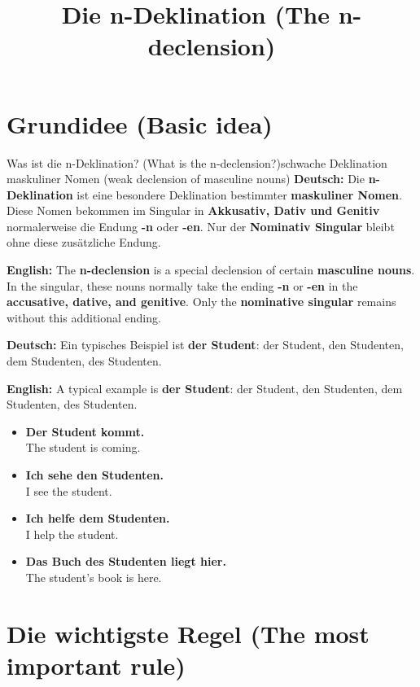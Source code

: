 \documentclass[a4paper,11pt]{article}
\title{Die n-Deklination \textnormal{(The n-declension)}}
\date{}
\newcommand{\GermanText}[1]{\textbf{Deutsch: }#1\par}
\newcommand{\EnglishText}[1]{{\small\color{SoftGray}\textbf{English: }#1\par}}
\newcommand{\ExampleItem}[2]{\item \textbf{#1}\\{\small\color{SoftGray}#2}}
\begin{document}
    \renewcommand{\contentsname}{Inhaltsverzeichnis \textnormal{(Table of Contents)}}
    \maketitle
    \tableofcontents
    \newpage

    \section{Grundidee \textnormal{(Basic idea)}}

        \begin{grammarentry}{Was ist die n-Deklination? \textnormal{(What is the n-declension?)}}{schwache Deklination maskuliner Nomen \textnormal{(weak declension of masculine nouns)}}
            \GermanText{Die \textbf{n-Deklination} ist eine besondere Deklination bestimmter \textbf{maskuliner Nomen}. Diese Nomen bekommen im Singular in \textbf{Akkusativ, Dativ und Genitiv} normalerweise die Endung \textbf{-n} oder \textbf{-en}. Nur der \textbf{Nominativ Singular} bleibt ohne diese zusätzliche Endung.}
            \EnglishText{The \textbf{n-declension} is a special declension of certain \textbf{masculine nouns}. In the singular, these nouns normally take the ending \textbf{-n} or \textbf{-en} in the \textbf{accusative, dative, and genitive}. Only the \textbf{nominative singular} remains without this additional ending.}

            \GermanText{Ein typisches Beispiel ist \textbf{der Student}: der Student, den Studenten, dem Studenten, des Studenten.}
            \EnglishText{A typical example is \textbf{der Student}: der Student, den Studenten, dem Studenten, des Studenten.}
        \end{grammarentry}

        \begin{exbox}
            \begin{itemize}
                \ExampleItem{Der Student kommt.}{The student is coming.}
                \ExampleItem{Ich sehe den Studenten.}{I see the student.}
                \ExampleItem{Ich helfe dem Studenten.}{I help the student.}
                \ExampleItem{Das Buch des Studenten liegt hier.}{The student's book is here.}
            \end{itemize}
        \end{exbox}

    \section{Die wichtigste Regel \textnormal{(The most important rule)}}
\end{document}
